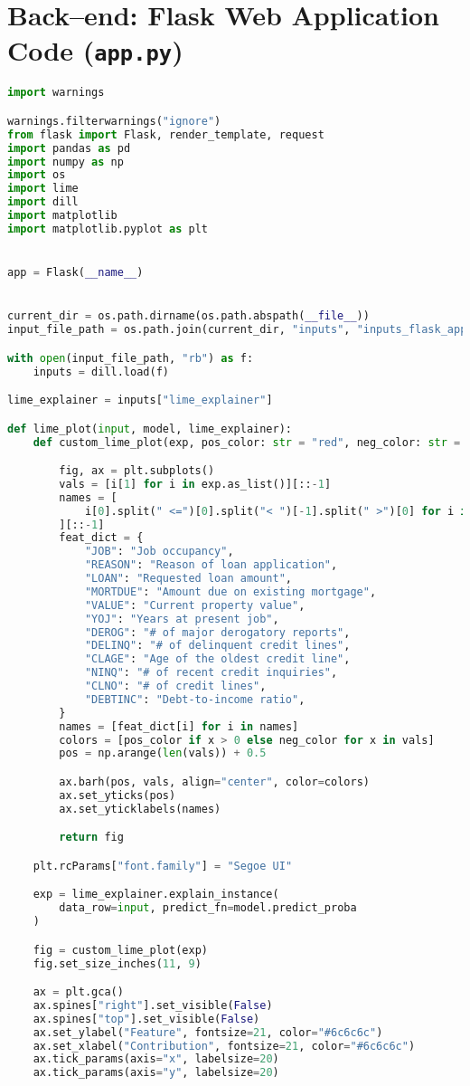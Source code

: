 \section{Back--end: Flask Web Application Code (\lstinline{app.py})}
\begin{lstlisting}[language=Python, basicstyle=\footnotesize\ttfamily]
import warnings

warnings.filterwarnings("ignore")
from flask import Flask, render_template, request
import pandas as pd
import numpy as np
import os
import lime
import dill
import matplotlib
import matplotlib.pyplot as plt


app = Flask(__name__)


current_dir = os.path.dirname(os.path.abspath(__file__))
input_file_path = os.path.join(current_dir, "inputs", "inputs_flask_app_dict.pkl")

with open(input_file_path, "rb") as f:
	inputs = dill.load(f)

lime_explainer = inputs["lime_explainer"]    

def lime_plot(input, model, lime_explainer):
	def custom_lime_plot(exp, pos_color: str = "red", neg_color: str = "green"):

		fig, ax = plt.subplots()
		vals = [i[1] for i in exp.as_list()][::-1]
		names = [
			i[0].split(" <=")[0].split("< ")[-1].split(" >")[0] for i in exp.as_list()
		][::-1]
		feat_dict = {
			"JOB": "Job occupancy",
			"REASON": "Reason of loan application",
			"LOAN": "Requested loan amount",
			"MORTDUE": "Amount due on existing mortgage",
			"VALUE": "Current property value",
			"YOJ": "Years at present job",
			"DEROG": "# of major derogatory reports",
			"DELINQ": "# of delinquent credit lines",
			"CLAGE": "Age of the oldest credit line",
			"NINQ": "# of recent credit inquiries",
			"CLNO": "# of credit lines",
			"DEBTINC": "Debt-to-income ratio",
		}
		names = [feat_dict[i] for i in names]
		colors = [pos_color if x > 0 else neg_color for x in vals]
		pos = np.arange(len(vals)) + 0.5

		ax.barh(pos, vals, align="center", color=colors)
		ax.set_yticks(pos)
		ax.set_yticklabels(names)

		return fig

	plt.rcParams["font.family"] = "Segoe UI"

	exp = lime_explainer.explain_instance(
		data_row=input, predict_fn=model.predict_proba
	)

	fig = custom_lime_plot(exp)
	fig.set_size_inches(11, 9)

	ax = plt.gca()
	ax.spines["right"].set_visible(False)
	ax.spines["top"].set_visible(False)
	ax.set_ylabel("Feature", fontsize=21, color="#6c6c6c")
	ax.set_xlabel("Contribution", fontsize=21, color="#6c6c6c")
	ax.tick_params(axis="x", labelsize=20)
	ax.tick_params(axis="y", labelsize=20)


\end{lstlisting}
